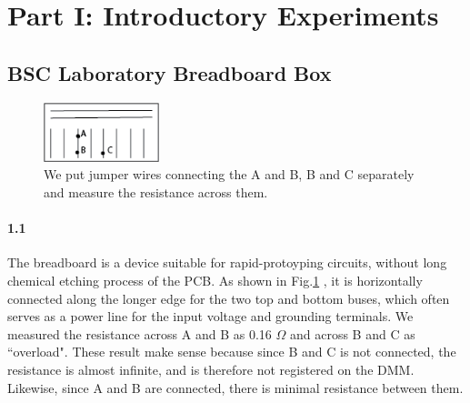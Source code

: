 \documentclass[authoryear, 12pt,5p, times]{elsarticle}
\begin{document}
\section{Part I: Introductory Experiments }
\subsection*{BSC Laboratory Breadboard Box}
\begin{figure}[h!]
\center
\includegraphics[width=0.3\textwidth]{figure/breadboard}
\caption{We put jumper wires connecting the A and B, B and C separately and measure the resistance across them.}
\label{breadboard}
\end{figure}
\paragraph{\textbf{1.1}}
The breadboard is a device suitable for rapid-protoyping circuits, without long chemical etching process of the PCB.  As shown in Fig.\ref{breadboard} , it is horizontally connected along the longer edge for the two top and bottom buses, which often serves as a power line for the input voltage and grounding terminals. We measured the resistance across A and B as 0.16 $\Omega$ and across B and C as ``overload".  These result make sense because since B and C is not connected, the resistance is almost infinite, and is therefore not registered on the DMM. Likewise, since A and B are connected, there is minimal resistance between them.
\end{document}
